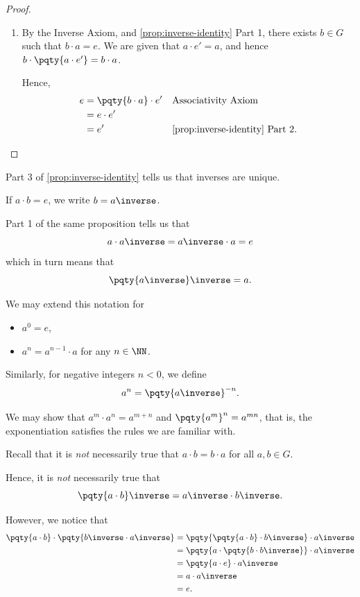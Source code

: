 \begin{proof}
\begin{enumerate}
        \item By the Inverse Axiom, and \autoref{prop:inverse-identity} Part 1, there exists \(b \in G\) such that \(b \cdot a = e\). We are given that \(a \cdot e' = a\), and hence \(b \cdot \pqty{a \cdot e'} = b \cdot a\).

        Hence,
        \begin{align*}
            e &= \pqty{b \cdot a} \cdot e' && \text{Associativity Axiom} \\
            &= e \cdot e' \\
            &= e' && \text{\autoref{prop:inverse-identity} Part 2}.
        \end{align*}
    \end{enumerate}    
\end{proof}

Part 3 of \autoref{prop:inverse-identity} tells us that inverses are unique.

\begin{notation}
    If \(a \cdot b = e\), we write \(b = a \inverse\).
\end{notation}

Part 1 of the same proposition tells us that
\[
    a \cdot a \inverse = a \inverse \cdot a = e
\]
which in turn means that
\[
    \pqty{a \inverse} \inverse = a.
\]

\begin{notation}
    We may extend this notation for
    \begin{itemize}
        \item \(a^0 = e\),
        \item \(a^n = a^{n - 1} \cdot a\) for any \(n \in \NN\).
    \end{itemize}

    Similarly, for negative integers \(n < 0\), we define
    \[
        a^n = \pqty{a \inverse}^{-n}.
    \]
\end{notation}

We may show that \(a^m \cdot a^n = a^{m + n}\) and \(\pqty{a^m}^n = a^{mn}\), that is, the exponentiation satisfies the rules we are familiar with.

Recall that it is \emph{not} necessarily true that \(a \cdot b = b \cdot a\) for all \(a, b \in G\).

Hence, it is \emph{not} necessarily true that
\[
    \pqty{a \cdot b}\inverse = a \inverse \cdot b \inverse.
\]

However, we notice that
\begin{align*}
    \pqty{a \cdot b} \cdot \pqty{b \inverse \cdot a \inverse} &= \pqty{\pqty{a \cdot b} \cdot b\inverse} \cdot a\inverse \\
    &= \pqty{a \cdot \pqty{b \cdot b\inverse}} \cdot a\inverse \\
    &= \pqty{a \cdot e} \cdot a\inverse \\
    &= a \cdot a\inverse \\
    &= e.
\end{align*}

